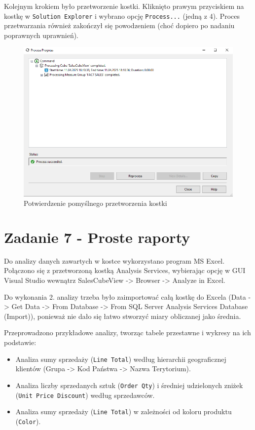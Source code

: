 \documentclass[a4paper,12pt]{article}
\begin{document}
Kolejnym krokiem było przetworzenie kostki. Kliknięto prawym przyciskiem na kostkę w \texttt{Solution Explorer} i wybrano opcję \texttt{Process...} (jedną z 4). Proces przetwarzania również zakończył się powodzeniem (choć dopiero po nadaniu poprawnych uprawnień).

\begin{figure}[H]
    \centering
    \includegraphics[width=1.0\textwidth]{images/6_success.png}
    \caption{Potwierdzenie pomyślnego przetworzenia kostki}
\end{figure}

\section{Zadanie 7 - Proste raporty}

Do analizy danych zawartych w kostce wykorzystano program MS Excel. Połączono się z przetworzoną kostką Analysis Services, wybierając opcję w GUI Visual Studio wewnątrz SalesCubeView -> Browser -> Analyze in Excel.

Do wykonania 2. analizy trzeba było zaimportować całą kostkę do Excela (Data -> Get Data -> From Database -> From SQL Server Analysis Services Database (Import)), ponieważ nie dało się łatwo stworzyć miary obliczanej jako średnia.

Przeprowadzono przykładowe analizy, tworząc tabele przestawne i wykresy na ich podstawie:
\begin{itemize}
    \item Analiza sumy sprzedaży (\texttt{Line Total}) według hierarchii geograficznej klientów (Grupa -> Kod Państwa -> Nazwa Terytorium).
    \item Analiza liczby sprzedanych sztuk (\texttt{Order Qty}) i średniej udzielonych zniżek (\texttt{Unit Price Discount}) według sprzedawców.
    \item Analiza sumy sprzedaży (\texttt{Line Total}) w zależności od koloru produktu (\texttt{Color}).
\end{itemize}
\end{document}
